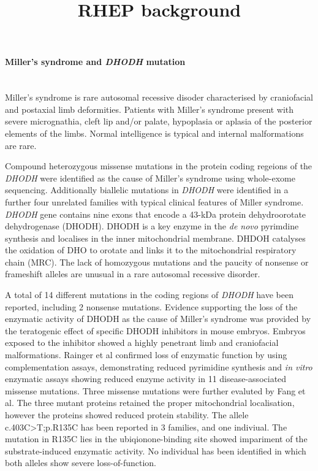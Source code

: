 \documentclass[12pt]{article}
\title{RHEP background}
\date{}
\begin{document}
	\maketitle
\paragraph{Miller's syndrome and \textit{DHODH} mutation}
~\\ Miller's syndrome is rare autosomal recessive disoder characterised by craniofacial and postaxial limb deformities. Patients with Miller's syndrome present with severe micrognathia, cleft lip and/or palate, hypoplasia or aplasia of the posterior elements of the limbs. Normal intelligence is typical and internal malformations are rare.

Compound heterozygous missense mutations in the protein coding regeions of the \textit{DHODH} were identified as the cause of Miller's syndrome using whole-exome sequencing. Additionally biallelic mutations in \textit{DHODH} were identified in a further four unrelated families with typical clinical features of Miller syndrome.  \textit{DHODH} gene contains nine exons that encode a 43-kDa protein dehydroorotate dehydrogenase (DHODH). DHODH is a key enzyme in the \textit{de novo} pyrimdine synthesis and  localises in the inner mitochondrial membrane. DHDOH catalyses the oxidation of DHO to orotate and links it to the mitochondrial respiratory chain (MRC). The lack of homozygous mutations and the paucity of nonsense or frameshift alleles are unusual in a rare autosomal recessive disorder. 

A total of 14 different mutations in the coding regions of \textit{DHODH} have been reported, including 2 nonsense mutations. Evidence supporting the loss of the enzymatic activity of DHODH as the cause of Miller's syndrome was provided by the teratogenic effect of specific DHODH inhibitors in mouse embryos. Embryos exposed to the inhibitor showed a highly penetrant limb and craniofacial malformations. Rainger et al confirmed loss of enzymatic function by using complementation assays, demonstrating reduced pyrimidine synthesis and \textit{in vitro} enzymatic assays showing reduced enzyme activity in 11 disease-associated missense mutations. Three missense mutations were further evaluted by Fang et al. The three mutant proteins retained the proper mitochondrial localisation, however the proteins showed reduced protein stability. The allele c.403C>T;p.R135C has been reported in 3 families, and one indiviual. The mutation in R135C lies in the ubiqionone-binding site showed impariment of the substrate-induced enzymatic activity. No individual has been identified in which both alleles show severe loss-of-function.  
\end{document}
